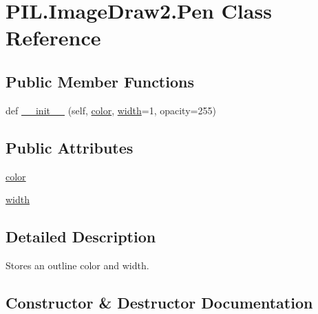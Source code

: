 \hypertarget{classPIL_1_1ImageDraw2_1_1Pen}{}\section{P\+I\+L.\+Image\+Draw2.\+Pen Class Reference}
\label{classPIL_1_1ImageDraw2_1_1Pen}
\subsection*{Public Member Functions}
\begin{DoxyCompactItemize}
\item 
def \hyperlink{classPIL_1_1ImageDraw2_1_1Pen_ab5c62d85f75e360bd6bf9d4e7bdf72ff}{\+\_\+\+\_\+init\+\_\+\+\_\+} (self, \hyperlink{classPIL_1_1ImageDraw2_1_1Pen_a41e85bc53d2faa1c2340d30796301c26}{color}, \hyperlink{classPIL_1_1ImageDraw2_1_1Pen_a9dbd25ce144d1b67f6fe7f8e0001f03f}{width}=1, opacity=255)
\end{DoxyCompactItemize}
\subsection*{Public Attributes}
\begin{DoxyCompactItemize}
\item 
\hyperlink{classPIL_1_1ImageDraw2_1_1Pen_a41e85bc53d2faa1c2340d30796301c26}{color}
\item 
\hyperlink{classPIL_1_1ImageDraw2_1_1Pen_a9dbd25ce144d1b67f6fe7f8e0001f03f}{width}
\end{DoxyCompactItemize}


\subsection{Detailed Description}
\begin{DoxyVerb}Stores an outline color and width.\end{DoxyVerb}
 

\subsection{Constructor \& Destructor Documentation}
\mbox{\label{classPIL_1_1ImageDraw2_1_1Pen_ab5c62d85f75e360bd6bf9d4e7bdf72ff}} 
